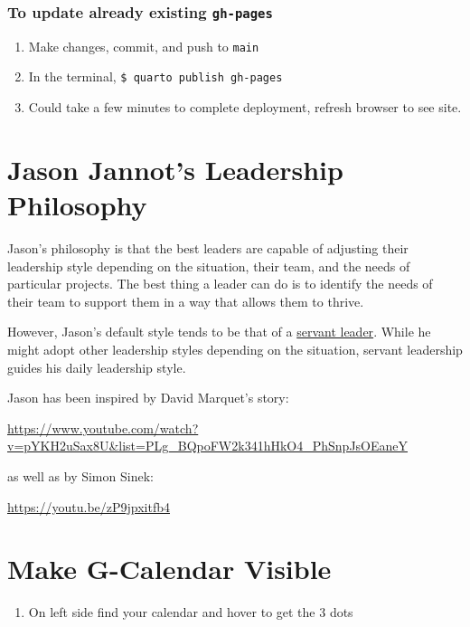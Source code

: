 \documentclass[
  letterpaper,
  DIV=11,
  numbers=noendperiod]{scrreprt}
\providecommand{\tightlist}{%
  \setlength{\itemsep}{0pt}\setlength{\parskip}{0pt}}\usepackage{longtable,booktabs,array}
\begin{document}
\subsection{\texorpdfstring{To update already existing
\texttt{gh-pages}}{To update already existing gh-pages}}\label{to-update-already-existing-gh-pages}

\begin{enumerate}
\def\labelenumi{\arabic{enumi}.}
\tightlist
\item
  Make changes, commit, and push to \texttt{main}
\item
  In the terminal, \texttt{\$\ quarto\ publish\ gh-pages}\\
\item
  Could take a few minutes to complete deployment, refresh browser to
  see site.
\end{enumerate}

\chapter{Jason Jannot's Leadership Philosophy}\label{sec-jj-philosophy}

Jason's philosophy is that the best leaders are capable of adjusting
their leadership style depending on the situation, their team, and the
needs of particular projects. The best thing a leader can do is to
identify the needs of their team to support them in a way that allows
them to thrive.

However, Jason's default style tends to be that of a
\href{https://en.wikipedia.org/wiki/Servant_leadership}{servant leader}.
While he might adopt other leadership styles depending on the situation,
servant leadership guides his daily leadership style.

Jason has been inspired by David Marquet's story:

\url{https://www.youtube.com/watch?v=pYKH2uSax8U&list=PLg_BQpoFW2k341hHkO4_PhSnpJsOEaneY}

as well as by Simon Sinek:

\url{https://youtu.be/zP9jpxitfb4}

\chapter{Make G-Calendar Visible}\label{sec-calendar}

\begin{enumerate}
\def\labelenumi{\arabic{enumi}.}
\tightlist
\item
  On left side find your calendar and hover to get the 3 dots
\end{enumerate}
\end{document}
